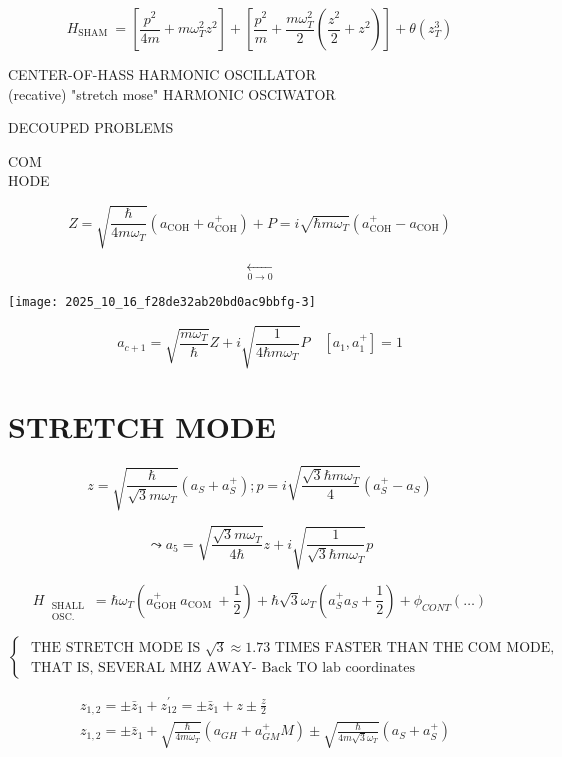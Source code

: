 $$
H_{\text {SHAM }}=\left[\frac{p^{2}}{4 m}+m \omega_{T}^{2} z^{2}\right]+\left[\frac{p^{2}}{m}+\frac{m \omega_{T}^{2}}{2}\left(\frac{z^{2}}{2}+z^{2}\right)\right]+\theta\left(z_{T}^{3}\right)
$$

CENTER-OF-HASS HARMONIC OSCILLATOR\\
(recative) "stretch mose" HARMONIC OSCIWATOR

DECOUPED PROBLEMS

COM\\
HODE

$$
Z=\sqrt{\frac{\hbar}{4 m \omega_{T}}}\left(a_{\mathrm{COH}}+a_{\mathrm{COH}}^{+}\right)+P=i \sqrt{\hbar m \omega_{T}}\left(a_{\mathrm{COH}}^{+}-a_{\mathrm{COH}}\right)
$$

$$
\underset{0 \rightarrow 0}{\leftarrow}
$$

\begin{center}
\texttt{[image: 2025\_10\_16\_f28de32ab20bd0ac9bbfg-3]}
\end{center}

$$
a_{c+1}=\sqrt{\frac{m \omega_{T}}{\hbar}} Z+i \sqrt{\frac{1}{4 \hbar m \omega_{T}}} P \quad\left[a_{1}, a_{1}^{+}\right]=1
$$

\section*{STRETCH MODE}
$$
z=\sqrt{\frac{\hbar}{\sqrt{3} m \omega_{T}}}\left(a_{S}+a_{S}^{+}\right) ; p=i \sqrt{\frac{\sqrt{3} \hbar m \omega_{T}}{4}}\left(a_{S}^{+}-a_{S}\right)
$$

$$
\leadsto a_{5}=\sqrt{\frac{\sqrt{3} m \omega_{T}}{4 \hbar}} z+i \sqrt{\frac{1}{\sqrt{3} \hbar m \omega_{T}}} p
$$

$$
H_{\substack{\text { SHALL } \\ \text { OSC. }}}=\hbar \omega_{T}\left(a_{\text {GOH }}^{+} a_{\text {COM }}+\frac{1}{2}\right)+\hbar \sqrt{3} \omega_{T}\left(a_{S}^{+} a_{S}+\frac{1}{2}\right)+\phi_{C O N T}(\ldots)
$$

$\left\{\begin{array}{l}\text { THE STRETCH MODE IS } \sqrt{3} \approx 1.73 \text { TIMES FASTER THAN THE COM MODE, } \\ \text { THAT IS, SEVERAL MHZ AWAY- Back TO lab coordinates }\end{array}\right.$

$$
\begin{aligned}
& z_{1,2}= \pm \bar{z}_{1}+z_{12}^{\prime}= \pm \bar{z}_{1}+z \pm \frac{z}{2} \\
& z_{1,2}= \pm \bar{z}_{1}+\sqrt{\frac{\hbar}{4 m \omega_{T}}}\left(a_{GH}+a_{GM}^{+} M\right) \pm \sqrt{\frac{\hbar}{4 m \sqrt{3} \omega_{T}}}\left(a_{S}+a_{S}^{+}\right)
\end{aligned}
$$

